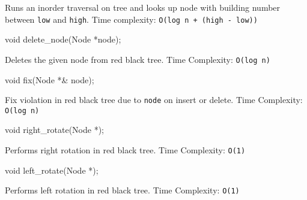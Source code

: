 \documentclass[
]{article}
\newenvironment{Shaded}{}{}
\newcommand{\DataTypeTok}[1]{\textcolor[rgb]{0.56,0.13,0.00}{#1}}
\newcommand{\NormalTok}[1]{#1}
\begin{document}
Runs an inorder traversal on tree and looks up node with building number
between \texttt{low} and \texttt{high}. Time complexity:
\texttt{O(log\ n\ +\ (high\ -\ low))}

\begin{Shaded}
\begin{Highlighting}[]
\DataTypeTok{void}\NormalTok{ delete_node(Node *node);}
\end{Highlighting}
\end{Shaded}

Deletes the given node from red black tree. Time Complexity:
\texttt{O(log\ n)}

\begin{Shaded}
\begin{Highlighting}[]
\DataTypeTok{void}\NormalTok{ fix(Node *& node);}
\end{Highlighting}
\end{Shaded}

Fix violation in red black tree due to \texttt{node} on insert or
delete. Time Complexity: \texttt{O(log\ n)}

\begin{Shaded}
\begin{Highlighting}[]
\DataTypeTok{void}\NormalTok{ right_rotate(Node *);}
\end{Highlighting}
\end{Shaded}

Performs right rotation in red black tree. Time Complexity:
\texttt{O(1)}

\begin{Shaded}
\begin{Highlighting}[]
\DataTypeTok{void}\NormalTok{ left_rotate(Node *);}
\end{Highlighting}
\end{Shaded}

Performs left rotation in red black tree. Time Complexity: \texttt{O(1)}
\end{document}
